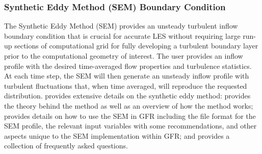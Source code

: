 \subsubsection{Synthetic Eddy Method (SEM) Boundary Condition}%
\label{SEC:BC:Inflow:SEM}

The Synthetic Eddy Method (SEM) provides an unsteady turbulent inflow boundary
condition that is crucial for accurate LES without requiring large run-up
sections of computational grid for fully developing a turbulent boundary layer
prior to the computational geometry of interest.
%
The user provides an inflow profile with the desired time-averaged flow
properties and turbulence statistics.
%
At each time step, the SEM will then generate an unsteady inflow profile with
turbulent fluctuations that, when time averaged, will reproduce the requested
distribution.
%
 provides extensive details on the synthetic eddy method:
%
 provides the theory behind the method as well as an
overview of how the method works;
%
 provides details on how to use the SEM in GFR including the
file format for the SEM profile, the relevant input variables with some
recommendations, and other aspects unique to the SEM implementation within GFR;
%
and  provides a collection of frequently asked questions.


